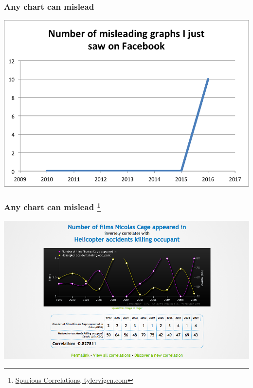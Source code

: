\begin{frame}
  \frametitle{Any chart can mislead
  }
  \begin{center}
    \includegraphics[height=0.7\textheight,valign=t]{images/misleading_graphs_2016}    
  \end{center}
\end{frame}

\begin{frame}
  \frametitle{Any chart can mislead
    \footnote{\tiny{\href{http://tylervigen.com/view_correlation?id=9233}{Spurious Correlations, tylervigen.com}}}  
  }
  \begin{center}
    \includegraphics[height=0.7\textheight,valign=t]{images/correlation_nic_cage_helicopter}    
  \end{center}
\end{frame}

